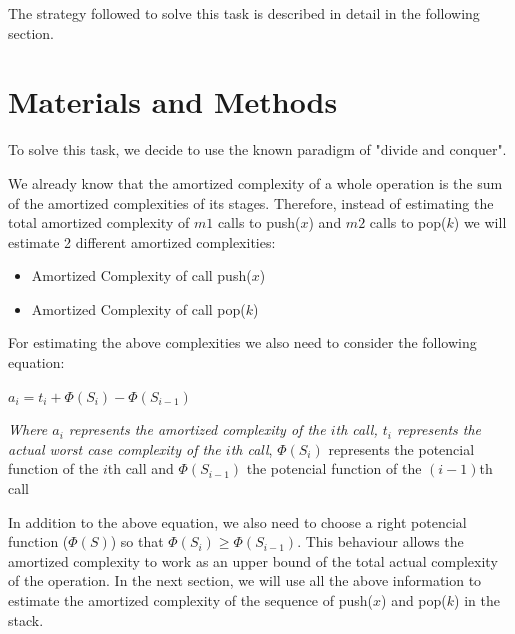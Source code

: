 \documentclass[12p]{report}
\begin{document}
\bigskip

The strategy followed to solve this task is described in detail in the following section.

 
  \section{Materials and Methods}			%

To solve this task, we decide to use the known paradigm of "divide and conquer". 

\bigskip

We already know that the amortized complexity of a whole operation is the sum of the amortized complexities of its stages. Therefore, instead of estimating the total amortized complexity of $m1$ calls to push($x$) and $m2$ calls to pop($k$) we will estimate 2 different amortized complexities:
\begin{itemize}
 \item Amortized Complexity of call push($x$)
 \item Amortized Complexity of call pop($k$)
\end{itemize}

\bigskip

For estimating the above complexities we also need to consider the following equation:

\begin{center}
\Large
$a_{i} = t_{i} + \Phi(S_{i}) - \Phi(S_{i-1}) $
\end{center}

\large

\textit{Where $a_{i}$ represents the amortized complexity of the $i$th call, $t_{i}$ represents the actual worst case complexity of the $i$th call}, $\Phi(S_{i})$ represents the potencial function of the $i$th call and $\Phi(S_{i-1})$ the potencial function of the $(i-1)$th call

\bigskip

In addition to the above equation, we also need to choose a right potencial function ($\Phi(S)$) so that $\Phi(S_{i}) \geq \Phi(S_{i-1})$. This behaviour allows the amortized complexity to work as an upper bound of the total actual complexity of the operation. In the next section, we will use all the above information to estimate the amortized complexity of the sequence of push($x$) and pop($k$) in the stack.
\end{document}
